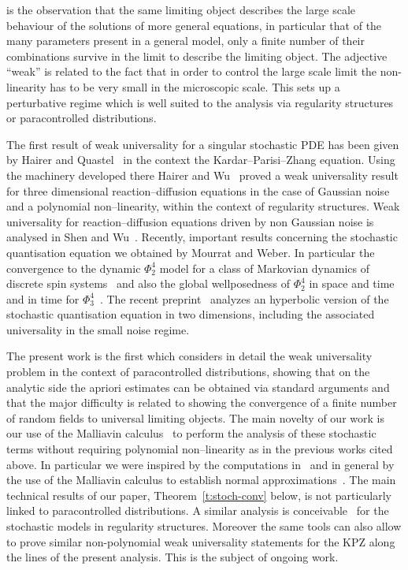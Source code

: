  is the observation that the same limiting object
describes the large scale behaviour of the solutions of more general
equations, in particular that of the many parameters present in a general
model, only a finite number of their combinations survive in the limit to
describe the limiting object. The adjective ``weak'' is related to the fact
that in order to control the large scale limit the non-linearity has to be
very small in the microscopic scale. This sets up a perturbative regime which
is well suited to the analysis via regularity structures or paracontrolled
distributions.

The first result of weak universality for a singular stochastic PDE has been
given by Hairer and Quastel~{\cite{hairer_class_2015}} in the context the
Kardar--Parisi--Zhang equation. Using the machinery developed there Hairer and
Wu~{\cite{hairer_large_2016}} proved a weak universality result for three
dimensional reaction--diffusion equations in the case of Gaussian noise and a
polynomial non--linearity, within the context of regularity structures. Weak
universality for reaction--diffusion equations driven by non Gaussian noise is
analysed in Shen and Wu~{\cite{shen_weak_2016}}. Recently, important results
concerning the stochastic quantisation equation we obtained by Mourrat and
Weber. In particular the convergence to the dynamic $\Phi^4_2$ model for a
class of Markovian dynamics of discrete spin
systems~{\cite{mourrat_convergence_2014}} and also the global wellposedness of
$\Phi^4_2$ in space and time~{\cite{mourrat_global_2015}} and in time for
$\Phi^4_3$~{\cite{mourrat_global_2016}}. The recent
preprint~{\cite{gubinelli_renormalization_2017}} analyzes an hyperbolic
version of the stochastic quantisation equation in two dimensions, including
the associated universality in the small noise regime.

The present work is the first which considers in detail the weak universality
problem in the context of paracontrolled distributions, showing that on the
analytic side the apriori estimates can be obtained via standard arguments and
that the major difficulty is related to showing the convergence of a finite
number of random fields to universal limiting objects. The main novelty of our
work is our use of the Malliavin
calculus~{\cite{nualart_2006,nourdin_peccati_2012}} to perform the analysis of
these stochastic terms without requiring polynomial non--linearity as in the
previous works cited above. In particular we were inspired by the computations
in~{\cite{nourdin_nualart_2007}} and in general by the use of the Malliavin
calculus to establish normal approximations~{\cite{nourdin_peccati_2012}}. The
main technical results of our paper, Theorem~\ref{t:stoch-conv} below, is not
particularly linked to paracontrolled distributions. A similar analysis is
conceivable \ for the stochastic models in regularity structures. Moreover the
same tools can also allow to prove similar non-polynomial weak universality
statements for the KPZ along the lines of the present analysis. This is the
subject of ongoing work.

